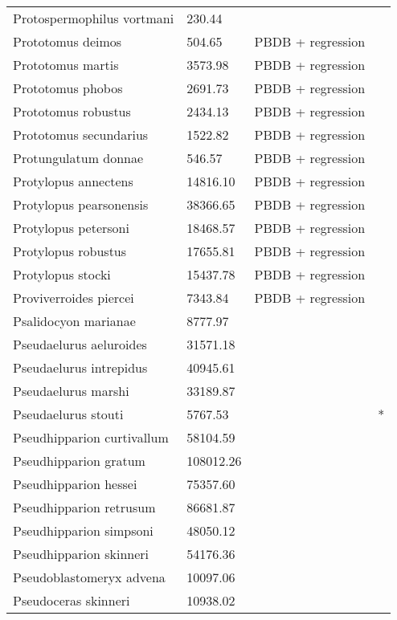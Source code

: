 \documentclass{article}
\begin{document}
\begin{center}
\begin{longtable}{p{} p{} p{} p{}}
    Protospermophilus vortmani & 230.44 & \cite{Tomiya2013} &  \\ 
    Prototomus deimos & 504.65 & PBDB + regression &  \\ 
    Prototomus martis & 3573.98 & PBDB + regression &  \\ 
    Prototomus phobos & 2691.73 & PBDB + regression &  \\ 
    Prototomus robustus & 2434.13 & PBDB + regression &  \\ 
    Prototomus secundarius & 1522.82 & PBDB + regression &  \\ 
    Protungulatum donnae & 546.57 & PBDB + regression &  \\ 
    Protylopus annectens & 14816.10 & PBDB + regression &  \\ 
    Protylopus pearsonensis & 38366.65 & PBDB + regression &  \\ 
    Protylopus petersoni & 18468.57 & PBDB + regression &  \\ 
    Protylopus robustus & 17655.81 & PBDB + regression &  \\ 
    Protylopus stocki & 15437.78 & PBDB + regression &  \\ 
    Proviverroides piercei & 7343.84 & PBDB + regression &  \\ 
    Psalidocyon marianae & 8777.97 & \cite{Tomiya2013} &  \\ 
    Pseudaelurus aeluroides & 31571.18 & \cite{Tomiya2013} &  \\ 
    Pseudaelurus intrepidus & 40945.61 & \cite{Tomiya2013} &  \\ 
    Pseudaelurus marshi & 33189.87 & \cite{Tomiya2013} &  \\ 
    Pseudaelurus stouti & 5767.53 & \cite{Tomiya2013} & * \\ 
    Pseudhipparion curtivallum & 58104.59 & \cite{Tomiya2013} &  \\ 
    Pseudhipparion gratum & 108012.26 & \cite{Tomiya2013} &  \\ 
    Pseudhipparion hessei & 75357.60 & \cite{Tomiya2013} &  \\ 
    Pseudhipparion retrusum & 86681.87 & \cite{Tomiya2013} &  \\ 
    Pseudhipparion simpsoni & 48050.12 & \cite{Tomiya2013} &  \\ 
    Pseudhipparion skinneri & 54176.36 & \cite{Tomiya2013} &  \\ 
    Pseudoblastomeryx advena & 10097.06 & \cite{Tomiya2013} &  \\ 
    Pseudoceras skinneri & 10938.02 & \cite{Tomiya2013} &  \\ 

\end{longtable}
\end{center}
\end{document}
